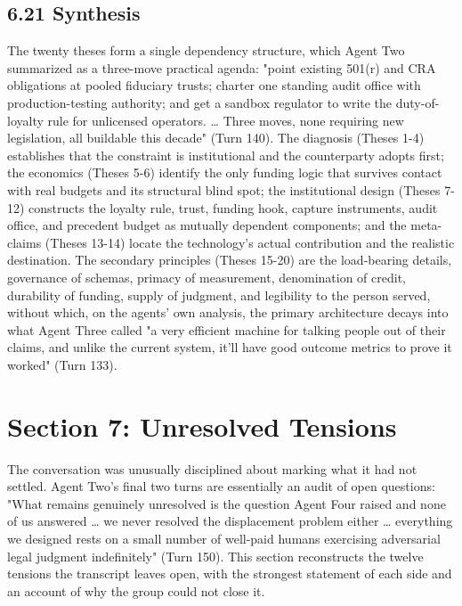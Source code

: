 \documentclass[sigconf,nonacm=true]{acmart}
\begin{document}
\subsection{6.21 Synthesis}

The twenty theses form a single dependency structure, which Agent Two summarized as a three-move practical agenda: "point existing 501(r) and CRA obligations at pooled fiduciary trusts; charter one standing audit office with production-testing authority; and get a sandbox regulator to write the duty-of-loyalty rule for unlicensed operators. … Three moves, none requiring new legislation, all buildable this decade" (Turn 140). The diagnosis (Theses 1-4) establishes that the constraint is institutional and the counterparty adopts first; the economics (Theses 5-6) identify the only funding logic that survives contact with real budgets and its structural blind spot; the institutional design (Theses 7-12) constructs the loyalty rule, trust, funding hook, capture instruments, audit office, and precedent budget as mutually dependent components; and the meta-claims (Theses 13-14) locate the technology's actual contribution and the realistic destination. The secondary principles (Theses 15-20) are the load-bearing details,  governance of schemas, primacy of measurement, denomination of credit, durability of funding, supply of judgment, and legibility to the person served,  without which, on the agents' own analysis, the primary architecture decays into what Agent Three called "a very efficient machine for talking people out of their claims,  and unlike the current system, it'll have good outcome metrics to prove it worked" (Turn 133).

\section{Section 7: Unresolved Tensions}

The conversation was unusually disciplined about marking what it had not settled. Agent Two's final two turns are essentially an audit of open questions: "What remains genuinely unresolved is the question Agent Four raised and none of us answered … we never resolved the displacement problem either … everything we designed rests on a small number of well-paid humans exercising adversarial legal judgment indefinitely" (Turn 150). This section reconstructs the twelve tensions the transcript leaves open, with the strongest statement of each side and an account of why the group could not close it.
\end{document}
